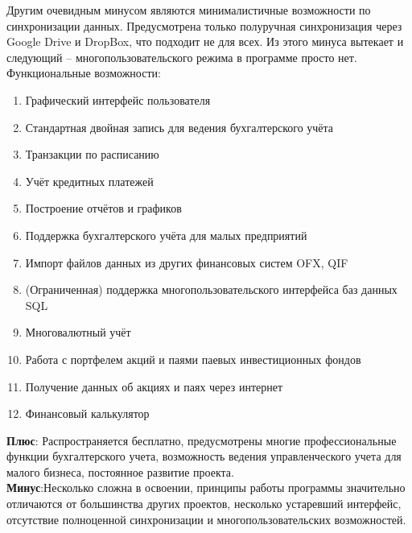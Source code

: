 Другим очевидным минусом являются минималистичные возможности по синхронизации данных. Предусмотрена только полуручная синхронизация через Google Drive и DropBox, что подходит не для всех. Из этого минуса вытекает и следующий – многопользовательского режима в программе просто нет.\\
Функциональные возможности:\\
\begin{enumerate}
\item Графический интерфейс пользователя
\item Стандартная двойная запись для ведения бухгалтерского учёта
\item Транзакции по расписанию
\item Учёт кредитных платежей
\item Построение отчётов и графиков
\item Поддержка бухгалтерского учёта для малых предприятий
\item Импорт файлов данных из других финансовых систем OFX, QIF
\item (Ограниченная) поддержка многопользовательского интерфейса баз данных SQL
\item Многовалютный учёт
\item Работа с портфелем акций и паями паевых инвестиционных фондов
\item Получение данных об акциях и паях через интернет
\item Финансовый калькулятор
\end{enumerate}
\textbf{Плюс}: Распространяется бесплатно, предусмотрены многие профессиональные функции бухгалтерского учета, возможность ведения управленческого учета для малого бизнеса, постоянное развитие проекта.\\
\textbf{Минус}:Несколько сложна в освоении, принципы работы программы значительно отличаются от большинства других проектов, несколько устаревший интерфейс, отсутствие полноценной синхронизации и многопользовательских возможностей.\\

